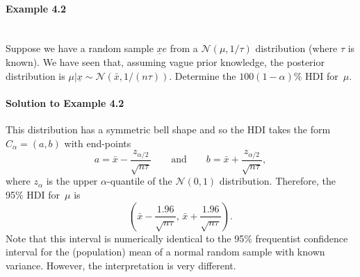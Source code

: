 \newpage

\paragraph{Example 4.2}{~\\
Suppose we have a random sample $\underline{x}e$ from a $\mathcal{N}(\mu,1/\tau)$
distribution (where $\tau$ is known). We have seen that, assuming
vague prior knowledge, the posterior distribution is $\mu|\underline{x}\sim
\mathcal{N}(\bar x,1/(n\tau))$. Determine the $100(1-\alpha)\%$ HDI for~$\mu$.

\paragraph{Solution to Example 4.2}{
    
    This distribution has a symmetric bell shape and so the HDI takes the
    form $C_\alpha=(a,b)$ with end-points
    $$
    a=\bar x - \frac{z_{\alpha/2}}{\sqrt{n\tau}}
    \quad\quad\text{and}\quad\quad
    b=\bar x + \frac{z_{\alpha/2}}{\sqrt{n\tau}},
    $$
    where $z_\alpha$ is the upper $\alpha$-quantile of the $\mathcal{N}(0,1)$
    distribution. Therefore, the 95\% HDI for~$\mu$ is 
    $$
    \left(\bar x - \frac{1.96}{\sqrt{n\tau}},\,
    \bar x + \frac{1.96}{\sqrt{n\tau}}\right).
    $$ 
    Note that this interval is numerically identical to the 95\% frequentist confidence interval for the (population) mean of a normal random sample with known variance. However, the interpretation is very
    different.
    
    
}}

\newpage

